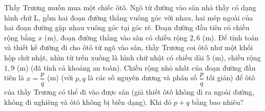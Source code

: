 \begin{ex}
Thầy Trương muốn mua một chiếc ôtô. Ngõ từ đường vào sân nhà thầy có dạng hình chữ L, gồm hai đoạn đường thẳng vuông góc với nhau, hai mép ngoài của hai đoạn đường gặp nhau vuông góc tại góc rẽ. Đoạn đường đầu tiên có chiều rộng bằng $x$ (m), đoạn đường thẳng vào sân có chiều rộng $2{,}6$ (m). Để tính toán và thiết kế đường đi cho ôtô từ ngõ vào sân, thầy Trương coi ôtô như một khối hộp chữ nhật, nhìn từ trên xuống là hình chữ nhật có chiều dài $5$ (m), chiều rộng $1{,}9$ (m) (đã tính cả khoảng an toàn). Chiều rộng nhỏ nhất của đoạn đường đầu tiên là $x=\dfrac pq$ (m) (với $p,q$ là các số nguyên dương và phân số $\dfrac pq$ tối giản) để ôtô của thầy Trương có thể đi vào được sân (giả thiết ôtô không đi ra ngoài đường, không đi nghiêng và ôtô không bị biến dạng). Khi đó $p+q$ bằng bao nhiêu?
\begin{center}
\end{center}

\end{ex}
